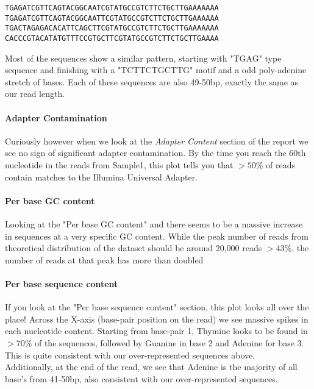 \begin{lstlisting}
TGAGATCGTTCAGTACGGCAATCGTATGCCGTCTTCTGCTTGAAAAAAA
TGAGATCGTTCAGTACGGCAATTCGTATGCCGTCTTCTGCTTGAAAAAA
TGACTAGAGACACATTCAGCTTCGTATGCCGTCTTCTGCTTGAAAAAAA
CACCCGTACATATGTTTCCGTGCTTCGTATGCCGTCTTCTGCTTGAAAA
\end{lstlisting}

Most of the sequences show a similar pattern, starting with "TGAG" type sequence and finishing with a "TCTTCTGCTTG" motif and a odd poly-adenine stretch of bases. Each of these sequences are also 49-50bp, exactly the same as our read length.

\paragraph{Adapter Contamination}
Curiously however when we look at the \textit{Adapter Content} section of the report we see no sign of significant adapter contamination.
By the time you reach the 60th nucleotide in the reads from Sample1, this plot tells you that $>50$\% of reads contain matches to the Illumina Universal Adapter.

\paragraph{Per base GC content}
Looking at the "Per base GC content" and there seems to be a massive increase in sequences at a very specific GC content. While the peak number of reads from theoretical distribution of the dataset should be around 20,000 reads $>43$\%, the number of reads at that peak has more than doubled

\paragraph{Per base sequence content}
If you look at the "Per base sequence content" section, this plot looks all over the place! Across the X-axis (base-pair position on the read) we see massive spikes in each nucleotide content. Starting from base-pair 1, Thymine looks to be found in $>70$\% of the sequences, followed by Guanine in base 2 and Adenine for base 3. This is quite consistent with our over-represented sequences above. \\
Additionally, at the end of the read, we see that Adenine is the majority of all base's from 41-50bp, also consistent with our over-represented sequences.

